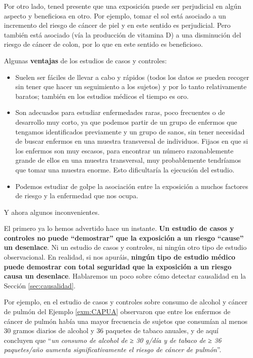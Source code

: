 \documentclass[
]{book}
\theoremstyle{definition}
\theoremstyle{definition}
\theoremstyle{definition}
\theoremstyle{definition}
\theoremstyle{remark}
\begin{document}
Por otro lado, tened presente que una exposición puede ser perjudicial en algún aspecto y beneficiosa en otro. Por ejemplo, tomar el sol está asociado a un incremento del riesgo de cáncer de piel y en este sentido es perjudicial. Pero también está asociado (vía la producción de vitamina D) a una disminución del riesgo de cáncer de colon, por lo que en este sentido es beneficioso.

Algunas \textbf{ventajas} de los estudios de casos y controles:

\begin{itemize}
\item
  Suelen ser fáciles de llevar a cabo y rápidos (todos los datos se pueden recoger sin tener que hacer un seguimiento a los sujetos) y por lo tanto relativamente baratos; también en los estudios médicos el tiempo es oro.
\item
  Son adecuados para estudiar enfermedades raras, poco frecuentes o de desarrollo muy corto, ya que podemos partir de un grupo de enfermos que tengamos identificados previamente y un grupo de sanos, sin tener necesidad de buscar enfermos en una muestra transversal de individuos. Fijaos en que si los enfermos son muy escasos, para encontrar un número razonablemente grande de ellos en una muestra transversal, muy probablemente tendríamos que tomar una muestra enorme. Esto dificultaría la ejecución del estudio.
\item
  Podemos estudiar de golpe la asociación entre la exposición a muchos factores de riesgo y la enfermedad que nos ocupa.
\end{itemize}

Y ahora algunos inconvenientes.

El primero ya lo hemos advertido hace un instante. \textbf{Un estudio de casos y controles no puede ``demostrar'' que la exposición a un riesgo ``cause'' un desenlace}. Ni un estudio de casos y controles, ni ningún otro tipo de estudio observacional. En realidad, si nos apuráis, \textbf{ningún tipo de estudio médico puede demostrar con total seguridad que la exposición a un riesgo causa un desenlace}. Hablaremos un poco sobre cómo detectar causalidad en la Sección \ref{sec:causalidad}.

Por ejemplo, en el estudio de casos y controles sobre consumo de alcohol y cáncer de pulmón del Ejemplo \ref{exm:CAPUA} observaron que entre los enfermos de cáncer de pulmón había una mayor frecuencia de sujetos que consumían al menos 30 gramos diarios de alcohol y 36 paquetes de tabaco anuales, y de aquí concluyen que ``\emph{un consumo de alcohol de ≥ 30 g/día y de tabaco de ≥ 36 paquetes/año aumenta significativamente el riesgo de cáncer de pulmón}''.
\end{document}
